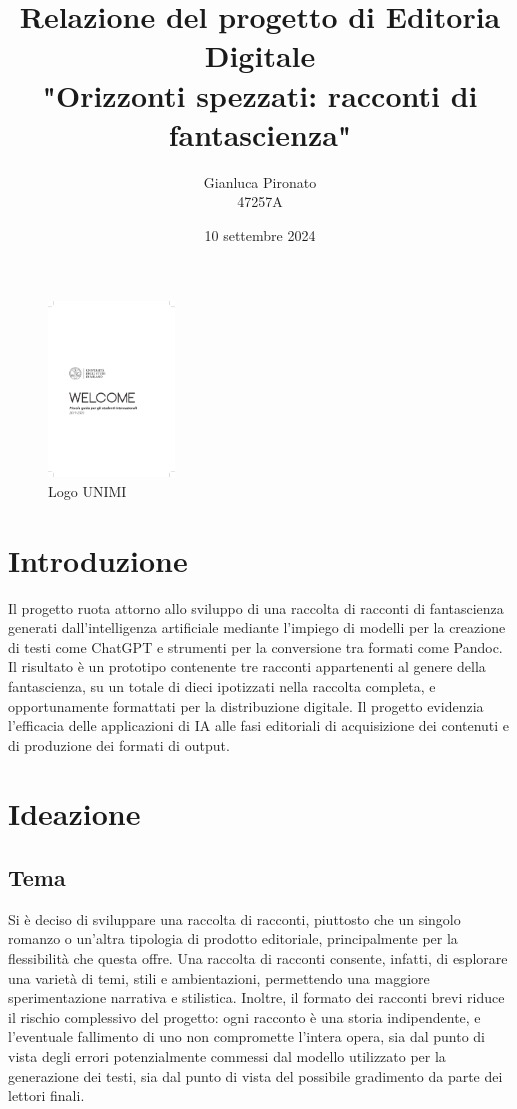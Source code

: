 \documentclass[a4paper,12pt]{article}
\title{Relazione del progetto di Editoria Digitale \\ "Orizzonti spezzati: racconti di fantascienza"}
\author{Gianluca Pironato \\ 47257A}
\date{10 settembre 2024}
\begin{document}
\clearpage\maketitle
\thispagestyle{empty}

\begin{figure}[h]
    \centering
    \includegraphics[width=0.3\textwidth]{unimi.pdf} %
    \caption{Logo UNIMI}
\end{figure}

\newpage

\setcounter{page}{1}

\section*{Introduzione}

Il progetto ruota attorno allo sviluppo di una raccolta di racconti di fantascienza generati dall'intelligenza artificiale mediante l'impiego di modelli per la creazione di testi come ChatGPT e strumenti per la conversione tra formati come Pandoc. Il risultato è un prototipo contenente tre racconti appartenenti al genere della fantascienza, su un totale di dieci ipotizzati nella raccolta completa, e opportunamente formattati per la distribuzione digitale. Il progetto evidenzia l'efficacia delle applicazioni di IA alle fasi editoriali di acquisizione dei contenuti e di produzione dei formati di output.

\section*{Ideazione}
\subsection*{Tema}

Si è deciso di sviluppare una raccolta di racconti, piuttosto che un singolo romanzo o un'altra tipologia di prodotto editoriale, principalmente per la flessibilità che questa offre. Una raccolta di racconti consente, infatti, di esplorare una varietà di temi, stili e ambientazioni, permettendo una maggiore sperimentazione narrativa e stilistica. Inoltre, il formato dei racconti brevi riduce il rischio complessivo del progetto: ogni racconto è una storia indipendente, e l'eventuale fallimento di uno non compromette l'intera opera, sia dal punto di vista degli errori potenzialmente commessi dal modello utilizzato per la generazione dei testi, sia dal punto di vista del possibile gradimento da parte dei lettori finali.
\end{document}
